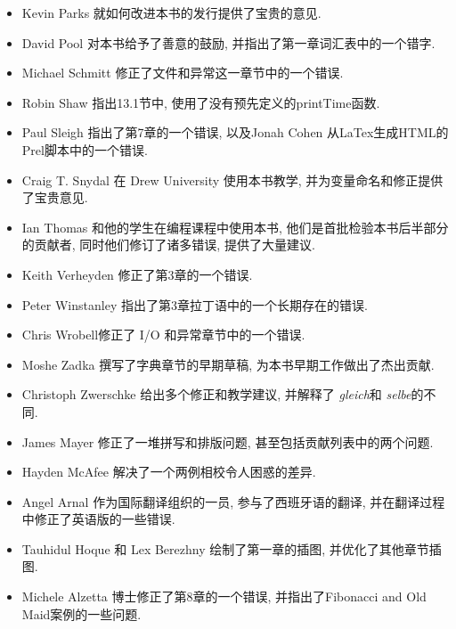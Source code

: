 \documentclass[10pt]{book}
\begin{document}
\begin{itemize}
\item Kevin Parks 就如何改进本书的发行提供了宝贵的意见. 

\item David Pool 对本书给予了善意的鼓励, 并指出了第一章词汇表中的一个错字. 

\item Michael Schmitt 修正了文件和异常这一章节中的一个错误. 

\item Robin Shaw 指出13.1节中, 使用了没有预先定义的printTime函数. 

\item Paul Sleigh 指出了第7章的一个错误, 
以及Jonah Cohen 从LaTex生成HTML的Prel脚本中的一个错误. 

\item Craig T. Snydal 在 Drew University 使用本书教学, 
并为变量命名和修正提供了宝贵意见. 

\item Ian Thomas 和他的学生在编程课程中使用本书, 
他们是首批检验本书后半部分的贡献者, 同时他们修订了诸多错误, 提供了大量建议. 

\item Keith Verheyden 修正了第3章的一个错误. 

\item Peter Winstanley 指出了第3章拉丁语中的一个长期存在的错误. 

\item Chris Wrobell修正了 I/O 和异常章节中的一个错误. 

\item Moshe Zadka 撰写了字典章节的早期草稿, 为本书早期工作做出了杰出贡献. 

\item Christoph Zwerschke 给出多个修正和教学建议, 并解释了
 {\em gleich}和 {\em selbe}的不同. 

\item James Mayer 修正了一堆拼写和排版问题, 甚至包括贡献列表中的两个问题. 

\item Hayden McAfee 解决了一个两例相校令人困惑的差异. 

\item Angel Arnal 作为国际翻译组织的一员, 参与了西班牙语的翻译, 
并在翻译过程中修正了英语版的一些错误. 

\item Tauhidul Hoque 和 Lex Berezhny 绘制了第一章的插图, 并优化了其他章节插图. 

\item Michele Alzetta 博士修正了第8章的一个错误, 
并指出了Fibonacci and Old Maid案例的一些问题. 


\end{itemize}
\end{document}
